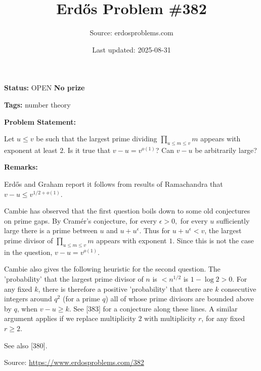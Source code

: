 \documentclass{article}
\title{Erd\H{o}s Problem \#382}
\date{Last updated: 2025-08-31}
\author{Source: erdosproblems.com}
\begin{document}
\maketitle

\noindent\textbf{Status:} OPEN \quad \textbf{No prize}

\noindent\textbf{Tags:} number theory

\medskip
\noindent\textbf{Problem Statement:}

Let $u\leq v$ be such that the largest prime dividing $\prod_{u\leq m\leq v}m$ appears with exponent at least $2$. Is it true that $v-u=v^{o(1)}$? Can $v-u$ be arbitrarily large?

\bigskip
\noindent\textbf{Remarks:}

Erd\H{o}s and Graham report it follows from results of Ramachandra that $v-u\leq v^{1/2+o(1)}$. 

Cambie has observed that the first question boils down to some old conjectures on prime gaps.
By Cram\'{er's conjecture}, for every $\epsilon>0,$ for every $u$ sufficiently large there is a prime between $u$ and $u+u^\epsilon$.
Thus for $u+u^\epsilon<v$, the largest prime divisor of \( \prod_{u \leq m \leq v} m \) appears with exponent $1$.
Since this is not the case in the question, \( v - u = v^{o(1)} \).

Cambie also gives the following heuristic for the second question. The 'probability' that the largest prime divisor of $n$ is $<n^{1/2}$ is $1-\log 2>0$. For any fixed $k$, there is therefore a positive 'probability' that there are $k$ consecutive integers around $q^2$ (for a prime $q$) all of whose prime divisors are bounded above by $q$, when $v-u\geq k$. See [383] for a conjecture along these lines. A similar argument applies if we replace multiplicity $2$ with multiplicity $r$, for any fixed $r\geq 2$.

See also [380].

\bigskip
\noindent\small{Source: \url{https://www.erdosproblems.com/382}}
\end{document}
